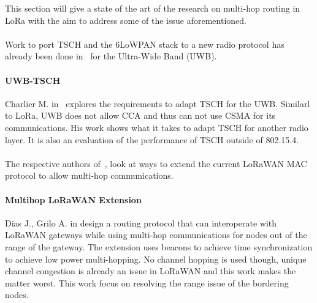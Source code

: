 This section will give a state of the art of the research on
multi-hop routing in LoRa with the aim to address some of the issue
aforementioned.

\paragraph{}

Work to port TSCH and the 6LoWPAN stack to a new radio protocol has already
been done in~\cite{uwbtsch} for the Ultra-Wide Band (UWB).

\paragraph{UWB-TSCH}

Charlier M. in~\cite{uwbtsch} explores the requirements to adapt TSCH for the UWB.
Similarl to LoRa, UWB does not allow CCA and thus can not use CSMA for its
communications.
His work shows what it takes to adapt TSCH for another radio layer.
It is also an evaluation of the performance of TSCH outside of 802.15.4.

\paragraph{}

The respective authors of~\cite{DIAS2018424, 8856256}, look at ways to extend
the current LoRaWAN MAC protocol to allow multi-hop communications.

\paragraph{Multihop LoRaWAN Extension} Dias J., Grilo A. in \cite{DIAS2018424}
design a routing protocol that can interoperate with LoRaWAN gateways while
using multi-hop communications for nodes out of the range of the gateway.
The extension uses beacons to achieve time synchronization to achieve low power
multi-hopping.
No channel hopping is used though, unique channel congestion is already an issue
in LoRaWAN and this work makes the matter worst.
This work focus on resolving the range issue of the bordering nodes.


